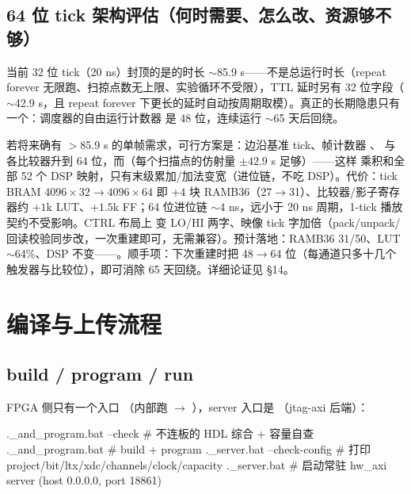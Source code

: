 \documentclass[11pt,oneside,openany]{book}
\begin{document}
\section{64 位 tick 架构评估（何时需要、怎么改、资源够不够）}
当前 32 位 tick（20 ns）封顶的是的时长 $\sim$85.9 s——不是总运行时长（repeat forever 无限跑、扫掠点数无上限、实验循环不受限），TTL 延时另有 32 位字段（$\sim$42.9 s，且 repeat forever 下更长的延时自动按周期取模）。真正的长期隐患只有一个：调度器的自由运行计数器  是 48 位，连续运行 $\sim$65 天后回绕。

若将来确有 $>$85.9 s 的单帧需求，可行方案是：边沿基准 tick、帧计数器 、 与各比较器升到 64 位，而（每个扫描点的仿射量 $\pm 42.9$ s 足够）——这样  乘积和全部 52 个 DSP 映射，只有末级累加/加法变宽（进位链，不吃 DSP）。代价：tick BRAM $4096\times 32 \to 4096\times 64$ 即 $+4$ 块 RAMB36（27$\to$31）、比较器/影子寄存器约 $+1$k LUT、$+1.5$k FF；64 位进位链 $\sim$4 ns，远小于 20 ns 周期，1-tick 播放契约不受影响。CTRL 布局上  变 LO/HI 两字、映像 tick 字加倍（pack/unpack/回读校验同步改，一次重建即可，无需兼容）。预计落地：RAMB36 31/50、LUT $\sim$64\%、DSP 不变——。顺手项：下次重建时把  48$\to$64 位（每通道只多十几个触发器与比较位），即可消除 65 天回绕。详细论证见  §14。

\chapter{编译与上传流程}

\section{build / program / run}
FPGA 侧只有一个入口 （内部跑  $\rightarrow$ ），server 入口是 （jtag-axi 后端）：

\begin{codeblock}[PowerShell]
.\fpga\build_and_program.bat --check    # 不连板的 HDL 综合 + 容量自查
.\fpga\build_and_program.bat            # build + program
.\fpga\run_server.bat --check-config    # 打印 project/bit/ltx/xdc/channels/clock/capacity
.\fpga\run_server.bat                    # 启动常驻 hw_axi server (host 0.0.0.0, port 18861)
\end{codeblock}
\end{document}
